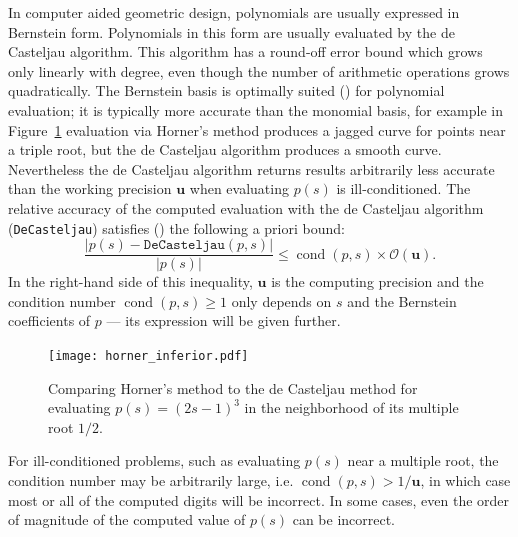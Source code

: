 \documentclass[3p, authoryear, square]{elsarticle}
\theoremstyle{definition}
\newcommand{\cond}[1]{\operatorname{cond}\left(#1\right)}
\newcommand{\bigO}[1]{\mathcal{O}\left(#1\right)}
\newcommand{\mach}{\mathbf{u}}
\begin{document}
In computer aided geometric design, polynomials are usually expressed in
Bernstein form. Polynomials in this form are usually evaluated by the
de Casteljau algorithm. This algorithm has a round-off error bound
which grows only linearly with degree, even though the number of
arithmetic operations grows quadratically. The Bernstein basis is
optimally suited (\cite{Farouki1987, Delgado2015, Mainar2005})
for polynomial evaluation; it is
typically more accurate than the monomial basis, for example in
Figure~\ref{fig:horner-inferior} evaluation via Horner's method produces
a jagged curve for points near a triple root, but the de Casteljau algorithm
produces a smooth curve. Nevertheless the de Casteljau
algorithm returns results arbitrarily less accurate than the working
precision \(\mach\) when evaluating \(p(s)\) is ill-conditioned.
The relative accuracy of the computed
evaluation with the de Casteljau algorithm (\texttt{DeCasteljau}) satisfies
(\cite{Mainar1999}) the following a priori bound:
\begin{equation}\label{de-casteljau-error}
  \frac{\left|p(s) - \mathtt{DeCasteljau}(p, s)\right|}{\left|p(s)\right|} \leq
  \cond{p, s} \times \bigO{\mach}.
\end{equation}
In the right-hand side of this inequality, \(\mach\) is the computing
precision and the condition number \(\cond{p, s} \geq 1\) only depends
on \(s\) and the Bernstein coefficients of \(p\) --- its expression will
be given further.

\begin{figure}
  \texttt{[image: horner\_inferior.pdf]}
  \centering
  \captionsetup{width=.75\linewidth}
  \caption{Comparing Horner's method to the de Casteljau method for
    evaluating \(p(s) = (2s - 1)^3\) in the neighborhood of its
    multiple root \(1/2\).}
  \label{fig:horner-inferior}
\end{figure}

For ill-conditioned problems, such as evaluating \(p(s)\) near a
multiple root, the condition number may be arbitrarily large, i.e.
\(\cond{p, s} > 1 / \mach\), in
which case most or all of the computed digits will be incorrect.
In some cases, even the order of magnitude of the computed value
of \(p(s)\) can be incorrect.
\end{document}
